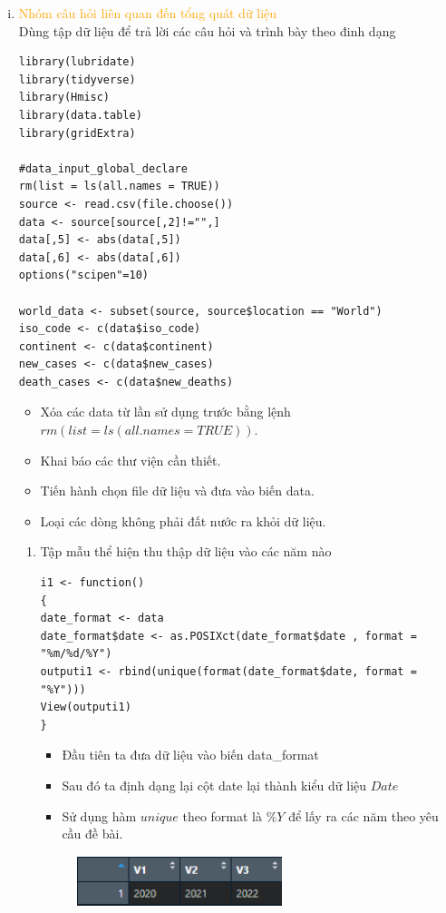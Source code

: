 \documentclass[a4paper]{article}
\theoremstyle{definition}
\begin{document}
\begin{enumerate}[i)]
	
	\item \textcolor{orange}{Nhóm câu hỏi liên quan đến tổng quát dữ liệu}\\
	Dùng tập dữ liệu để trả lời các câu hỏi và trình bày theo đinh dạng
	\begin{lstlisting}[frame=single]
library(lubridate)
library(tidyverse)
library(Hmisc)
library(data.table)
library(gridExtra)

#data_input_global_declare
rm(list = ls(all.names = TRUE))
source <- read.csv(file.choose())
data <- source[source[,2]!="",]
data[,5] <- abs(data[,5])
data[,6] <- abs(data[,6])
options("scipen"=10)

world_data <- subset(source, source$location == "World")
iso_code <- c(data$iso_code)
continent <- c(data$continent)
new_cases <- c(data$new_cases)
death_cases <- c(data$new_deaths)
	\end{lstlisting}
\begin{itemize}
    \item Xóa các data từ lần sử dụng trước bằng lệnh $rm(list = ls(all.names = TRUE))$.
    \item Khai báo các thư viện cần thiết.
    \item Tiến hành chọn file dữ liệu và đưa vào biến data.
    \item Loại các dòng không phải đất nước ra khỏi dữ liệu.
\end{itemize}
	\begin{enumerate}[1)]
		
		\item Tập mẫu thể hiện thu thập dữ liệu vào các năm nào
		\begin{lstlisting}[frame=single]  
i1 <- function()
{
date_format <- data
date_format$date <- as.POSIXct(date_format$date , format = "%m/%d/%Y")
outputi1 <- rbind(unique(format(date_format$date, format = "%Y")))
View(outputi1)
}
		\end{lstlisting}
		\begin{itemize}
            \item Đầu tiên ta đưa dữ liệu vào biến data\_format\\
            \item Sau đó ta định dạng lại cột date lại thành kiểu dữ liệu $Date$\\
            \item Sử dụng hàm $unique$ theo format là $\%Y$ để lấy ra các năm theo yêu cầu đề bài.
        \end{itemize}
		\begin{figure}[h!]
		\begin{center}
		    \includegraphics[width=6cm,height=1.5cm]{Images/I/I1.png}
		\end{center}
		\end{figure}
		

\end{enumerate}
\end{enumerate}
\end{document}
